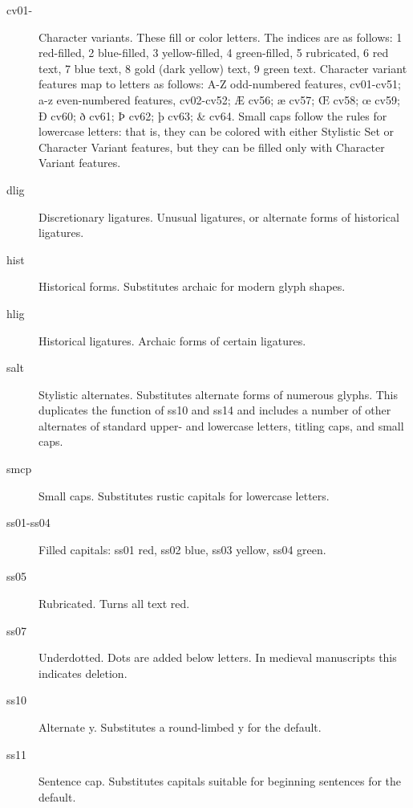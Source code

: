\documentclass[11pt,letterpaper,twoside,openany]{book}
\begin{document}
{\normalsize\irrm
\begin{description}

  \item[\irsc cv01-] Character variants. These fill or color letters. The indices
  are as follows: 1 red-filled, 2 blue-filled, 3 yellow-filled, 4 green-filled,
  5 rubricated, 6 red text, 7 blue text, 8 gold (dark yellow) text, 9 green text.
  Character variant features map to letters as follows: A-Z odd-numbered
  features, cv01-cv51; a-z even-numbered features, cv02-cv52; Æ cv56;
  æ cv57; Œ cv58; œ cv59; Ð cv60; ð cv61; Þ cv62; þ cv63; \& cv64. Small caps follow the rules
  for lowercase letters: that is, they can be colored with either Stylistic
  Set or Character Variant features, but they can be filled only with
  Character Variant features.
  
  \item[\irsc dlig] Discretionary ligatures. Unusual ligatures, or alternate forms of
  historical ligatures.

  \item[\irsc hist] Historical forms. Substitutes archaic for modern glyph shapes.

  \item[\irsc hlig] Historical ligatures. Archaic forms of certain ligatures.

  \item[\irsc salt] Stylistic alternates. Substitutes alternate forms of numerous
  glyphs. This duplicates the function of ss10 and ss14 and includes a 
  number of other alternates of standard upper- and lowercase letters,
  titling caps, and small caps.

  \item[\irsc smcp] Small caps. Substitutes rustic capitals for lowercase letters.


  \item[\irsc ss01-ss04] Filled capitals: ss01 red, ss02 blue, ss03 yellow, ss04 green.

  \item[\irsc ss05] Rubricated. Turns all text red.

  \item[\irsc ss07] Underdotted. Dots are added below letters. In medieval
  manuscripts this indicates deletion.

  \item[\irsc ss10] Alternate y. Substitutes a round-limbed y for the default.

  \item[\irsc ss11] Sentence cap. Substitutes capitals suitable for beginning sentences
  for the default.


\end{description}}
\end{document}
